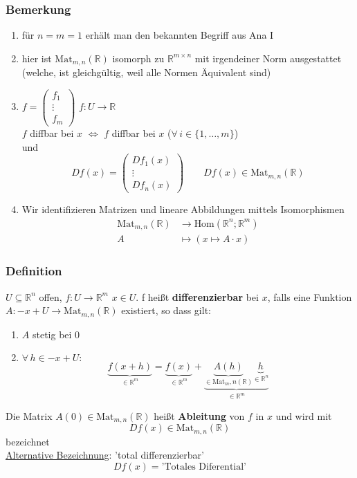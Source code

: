 \subsubsection{Bemerkung} %
\label{ssub:bemerkung}
\begin{enumerate}
	\item für $n=m=1$ erhält man den bekannten Begriff aus Ana I 
	\item hier ist $\text{Mat}_{m,n}(\mathbb{R})$ isomorph zu $\mathbb{R}^{m \times n}$ mit irgendeiner Norm ausgestattet (welche, ist gleichgültig, weil alle Normen
	Äquivalent sind)
	\item $f= \begin{pmatrix}
		f_1 \\ \vdots \\ f_m
	\end{pmatrix}$ $f: U \to \mathbb{R}$ \\
	$f$ diffbar bei $x$ $\Leftrightarrow$ $f$ diffbar bei $x$ ($\forall\, i \in \{1,\dots,m\}$) \\
	und
	\[
		Df(x)= \begin{pmatrix}
			Df_1(x) \\
			\vdots \\
			Df_n(x)
		\end{pmatrix} \qquad Df(x) \in \text{Mat}_{m,n}(\mathbb{R})
	\]
	\item Wir identifizieren Matrizen und lineare Abbildungen mittels Isomorphismen
	\begin{align*}
		\text{Mat}_{m,n}(\mathbb{R}) &\rightarrow \text{Hom}(\mathbb{R}^n;\mathbb{R}^m) \\
		 A &\mapsto (x \mapsto A \cdot x)
	\end{align*}
\end{enumerate}
\subsubsection{Definition} %
\label{ssub:definition}
$U \subseteq \mathbb{R}^n$ offen, $f:U \to \mathbb{R}^m$ $x \in U$. f heißt {\bfseries differenzierbar} bei $x$, falls eine Funktion $A: -x+U \to \text{Mat}_{m,n}(\mathbb{R})$ existiert, so dass gilt:
\begin{enumerate}
	\item $A$ stetig bei 0
	\item $\forall\, h \in -x+U:$
	\[
		\underset{\in \mathbb{R}^m}{\underbrace{f(x+h)}} = \underset{\in \mathbb{R}^m}{\underbrace{f(x)}} + \underset{\in \mathbb{R}^m}{\underbrace{\underset{
		\in \text{Mat}_m,n(\mathbb{R})}{\underbrace{A(h)}}
		\underset{\in \mathbb{R}^n}{\underbrace{h}}}}
	\]
\end{enumerate}
Die Matrix $A(0) \in \text{Mat}_{m,n}(\mathbb{R})$ heißt {\bfseries Ableitung} von $f$ in $x$ und wird mit
\[
	Df(x) \in \text{Mat}_{m,n}(\mathbb{R})
\]
bezeichnet \\
\underline{Alternative Bezeichnung}:
'total differenzierbar' \\
\[
	Df(x)=\text{'Totales Diferential'}
\]
